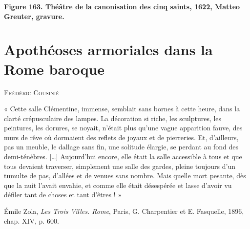 \documentclass[12pt,twoside,openany]{book}
\renewenvironment{quote}
  {%
    \par\begingroup
    \fontsize{11pt}{14pt}\selectfont
    \list{}{\leftmargin=1.5em\rightmargin=1.5em}%
    \item\relax
  }
  {%
    \endlist
    \endgroup
  }
\newcommand{\PurhContributors}[1]{%
  \par\vspace{0.5\baselineskip}%
  {\normalsize\scshape #1\par}%
  \vspace{0.6\baselineskip}%
}
\newenvironment{PurhBlockQuote}
  {%
    \begin{quote}
  }
  {%
    \end{quote}
  }
\begin{document}
\begin{center}
\par\small \textbf{Figure 163. Théâtre de la canonisation des cinq saints, 1622, Matteo Greuter, gravure.}
\end{center}

\chapter{Apothéoses armoriales dans la Rome baroque}

\PurhContributors{Frédéric Cousinié}

\begin{PurhBlockQuote}
« Cette salle Clémentine, immense, semblait sans bornes à cette heure, dans la clarté crépusculaire des lampes. La décoration si riche, les sculptures, les peintures, les dorures, se noyait, n’était plus qu’une vague apparition fauve, des murs de rêve où dormaient des reflets de joyaux et de pierreries. Et, d’ailleurs, pas un meuble, le dallage sans fin, une solitude élargie, se perdant au fond des demi-ténèbres. […] Aujourd’hui encore, elle était la salle accessible à tous et que tous devaient traverser, simplement une salle des gardes, pleine toujours d’un tumulte de pas, d’allées et de venues sans nombre. Mais quelle mort pesante, dès que la nuit l’avait envahie, et comme elle était désespérée et lasse d’avoir vu défiler tant de choses et tant d’êtres ! »
\par\raggedleft\small Émile Zola, \textit{Les Trois Villes. Rome}, Paris, G. Charpentier et E. Fasquelle, 1896, chap. XIV, p. 600.
\end{PurhBlockQuote}
\end{document}
